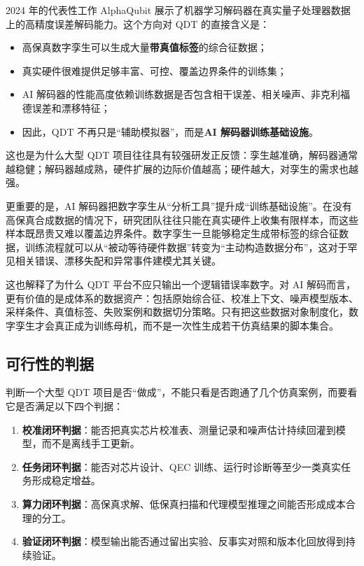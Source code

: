 \documentclass[11pt,a4paper]{article}
\newcommand{\QDT}{QDT}
\newcommand{\QEC}{QEC}
\begin{document}
2024 年的代表性工作 AlphaQubit 展示了机器学习解码器在真实量子处理器数据上的高精度误差解码能力。这个方向对 \QDT{} 的直接含义是：

\begin{itemize}
  \item 高保真数字孪生可以生成大量\textbf{带真值标签}的综合征数据；
  \item 真实硬件很难提供足够丰富、可控、覆盖边界条件的训练集；
  \item AI 解码器的性能高度依赖训练数据是否包含相干误差、相关噪声、非克利福德误差和漂移特征；
 \item 因此，\QDT{} 不再只是“辅助模拟器”，而是\textbf{AI 解码器训练基础设施}。
\end{itemize}

这也是为什么大型 \QDT{} 项目往往具有较强研发正反馈：孪生越准确，解码器通常越稳健；解码器越成熟，硬件扩展的边际价值越高；硬件越大，对孪生的需求也越强。

更重要的是，AI 解码器把数字孪生从“分析工具”提升成“训练基础设施”。在没有高保真合成数据的情况下，研究团队往往只能在真实硬件上收集有限样本，而这些样本既昂贵又难以覆盖边界条件。数字孪生一旦能够稳定生成带标签的综合征数据，训练流程就可以从“被动等待硬件数据”转变为“主动构造数据分布”，这对于罕见相关错误、漂移失配和异常事件建模尤其关键。

这也解释了为什么 \QDT{} 平台不应只输出一个逻辑错误率数字。对 AI 解码而言，更有价值的是成体系的数据资产：包括原始综合征、校准上下文、噪声模型版本、采样条件、真值标签、失败案例和数据切分策略。只有把这些数据对象制度化，数字孪生才会真正成为训练母机，而不是一次性生成若干仿真结果的脚本集合。

\subsection{可行性的判据}

判断一个大型 \QDT{} 项目是否“做成”，不能只看是否跑通了几个仿真案例，而要看它是否满足以下四个判据：

\begin{enumerate}
  \item \textbf{校准闭环判据}：能否把真实芯片校准表、测量记录和噪声估计持续回灌到模型，而不是离线手工更新。
  \item \textbf{任务闭环判据}：能否对芯片设计、\QEC{} 训练、运行时诊断等至少一类真实任务形成稳定增益。
  \item \textbf{算力闭环判据}：高保真求解、低保真扫描和代理模型推理之间能否形成成本合理的分工。
  \item \textbf{验证闭环判据}：模型输出能否通过留出实验、反事实对照和版本化回放得到持续验证。
\end{enumerate}
\end{document}
